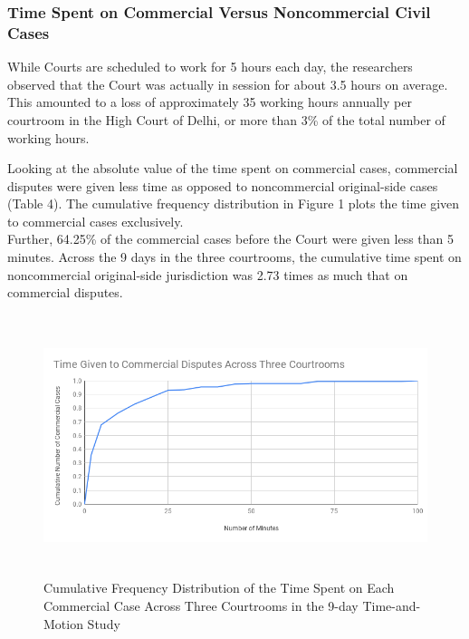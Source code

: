 \documentclass[a4paper, 12pt, twoside]{article}
\begin{document}
\subsubsection{Time Spent on Commercial Versus Noncommercial Civil Cases}
While Courts are scheduled to work for 5 hours each day, the researchers observed that the Court was actually in session for about 3.5 hours on average. This amounted to a loss of approximately 35 working hours annually per courtroom in the High Court of Delhi, or more than 3\% of the total number of working hours.

Looking at the absolute value of the time spent on commercial cases, commercial disputes were given less time as opposed to noncommercial original-side cases (Table 4). The cumulative frequency distribution in Figure 1 plots the time given to commercial cases exclusively. \\

Further, 64.25\% of the commercial cases before the Court were given less than 5 minutes. Across the 9 days in the three courtrooms, the cumulative time spent on noncommercial original-side jurisdiction was 2.73 times as much that on commercial disputes. 

\begin{figure}[H] %
\centering
\includegraphics[height = 3in]{fig1.png}
\captionsetup{justification=centering}\caption[Optional Caption]{Cumulative Frequency Distribution of the Time Spent on Each Commercial Case Across Three Courtrooms in the 9-day Time-and-Motion Study}
\end{figure}
\end{document}
